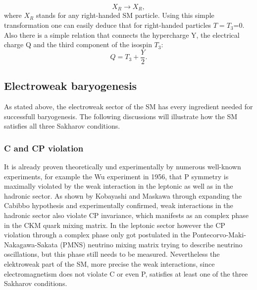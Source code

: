 \begin{equation*}
	X_R\longrightarrow X_R,
\end{equation*}
where $X_R$ stands for any right-handed SM particle. Using this simple transformation one can easily deduce that for right-handed particles $T=T_3$=0.\newline\indent
Also there is a simple relation that connects the hypercharge Y, the electrical charge Q and the third component of the isospin $T_3$:
\begin{equation}
Q=T_3+\frac{Y}{2}
\label{eq:ladung_hyperladung_isospin}.
\end{equation}
\subsection{Electroweak baryogenesis}
As stated above, the electroweak sector of the SM has every ingredient needed for successfull baryogenesis. The following discussions will illustrate how the SM satisfies all three Sakharov conditions.
\subsubsection{C and CP violation}
It is already proven theoretically und experimentally by numerous well-known experiments, for example the Wu experiment in 1956, that P symmetry is maximally violated by the weak interaction in the leptonic as well as in the hadronic sector. As shown by Kobayashi and Maskawa through expanding the Cabibbo hypothesis and experimentally confirmed, weak interactions in the hadronic sector also violate CP invariance, which manifests as an complex phase in the CKM quark mixing matrix. In the leptonic sector however the CP violation through a complex phase only got postulated in the Pontecorvo-Maki-Nakagawa-Sakata (PMNS) neutrino mixing matrix trying to describe neutrino oscillations, but this phase still needs to be measured.\newline\indent
Nevertheless the elektroweak part of the SM, more precise the weak interactions, since electromagnetism does not violate C or even P, satisfies at least one of the three Sakharov conditions.\newline\indent
